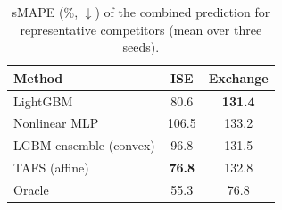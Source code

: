 \begin{table}[t]
\centering
\caption{sMAPE (\%, $\downarrow$) of the combined prediction for representative competitors (mean over three seeds).}
\label{tab:smape}
\small
\begin{tabular}{lcc}
\toprule
Method & ISE & Exchange \\
\midrule
LightGBM & 80.6 & \textbf{131.4} \\
Nonlinear MLP & 106.5 & 133.2 \\
LGBM-ensemble (convex) & 96.8 & 131.5 \\
TAFS (affine) & \textbf{76.8} & 132.8 \\
\midrule
Oracle & 55.3 & 76.8 \\
\bottomrule
\end{tabular}
\end{table}
